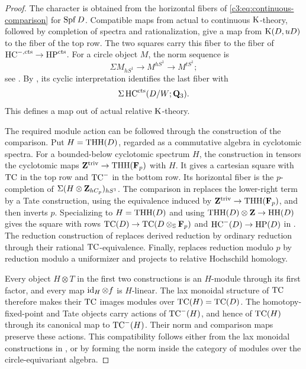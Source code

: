 \begin{proof}
The character is obtained from the horizontal fibers of
\eqref{c3:eq:continuous-comparison} for $\operatorname{Spf} D$.
Compatible maps from actual to continuous $\operatorname{K}$-theory, followed by
completion of spectra and rationalization, give a map from
$\operatorname{K}(D,uD)$ to the fiber of the top row.
The two squares carry this fiber to the fiber of
$\operatorname{HC}^{-,\mathrm{cts}}\to\operatorname{HP}^{\mathrm{cts}}$.
For a circle object $M$, the norm sequence is
\[
 \Sigma M_{hS^1}\longrightarrow M^{hS^1}
       \longrightarrow M^{tS^1};
\]
see \cite[\S I.3 and Corollary~I.4.3]{NikolausScholze}.
By \cite[Theorem~2.1, Lemma~2.2, and Theorem~2.3]{HoyoisCircle},
its cyclic interpretation identifies the last fiber with
\[\Sigma\operatorname{HC}^{\mathrm{cts}}(D/W;\mathbf{Q}_3).\]
This defines a map out of actual relative $\operatorname{K}$-theory.

The required module action can be followed through the construction of
the comparison. Put $H=\operatorname{THH}(D)$, regarded as a commutative algebra in
cyclotomic spectra.
For a bounded-below cyclotomic spectrum $H$, the construction in
\cite[Proposition~2.8]{AMMN} tensors the cyclotomic maps
$\mathbf{Z}^{\mathrm{triv}}\to\operatorname{THH}(\mathbf{F}_p)$ with $H$.
It gives a cartesian square with $\operatorname{TC}$ in the top row and $\operatorname{TC}^-$ in
the bottom row.
Its horizontal fiber is the $p$-completion of
$\Sigma(H\otimes\mathbf{Z}_{hC_p})_{hS^1}$.
The comparison in \cite[Corollary~2.10]{AMMN} replaces the lower-right
term by a Tate construction, using the equivalence induced by
$\mathbf{Z}^{\mathrm{triv}}\to\operatorname{THH}(\mathbf{F}_p)$, and then inverts $p$.
Specializing to $H=\operatorname{THH}(D)$ and using
$\operatorname{THH}(D)\otimes\mathbf{Z}\to\operatorname{HH}(D)$ gives the square with rows
$\operatorname{TC}(D)\to\operatorname{TC}(D\otimes_{\mathbb{S}}\mathbf{F}_p)$ and
$\operatorname{HC}^-(D)\to\operatorname{HP}(D)$ in \cite[Theorem~2.12]{AMMN}.
The reduction construction of \cite[Definition~2.14]{AMMN} replaces
derived reduction by ordinary reduction through their rational
$\operatorname{TC}$-equivalence.
Finally, \cite[Proposition~4.10]{AMMN} replaces reduction modulo $p$
by reduction modulo a uniformizer and projects to relative
Hochschild homology.

Every object $H\otimes T$ in the first two constructions is an
$H$-module through its first factor, and every map
$\operatorname{id}_H\otimes f$ is $H$-linear.
The lax monoidal structure of $\operatorname{TC}$ therefore makes their $\operatorname{TC}$ images
modules over $\operatorname{TC}(H)=\operatorname{TC}(D)$.
The homotopy-fixed-point and Tate objects carry actions of $\operatorname{TC}^-(H)$,
and hence of $\operatorname{TC}(H)$ through its canonical map to $\operatorname{TC}^-(H)$.
Their norm and comparison maps preserve these actions.
This compatibility follows either from the lax monoidal constructions
in \cite[\S I.3 and Corollary~I.4.3]{NikolausScholze}, or by forming the norm
inside the category of modules over the circle-equivariant algebra.


\end{proof}
